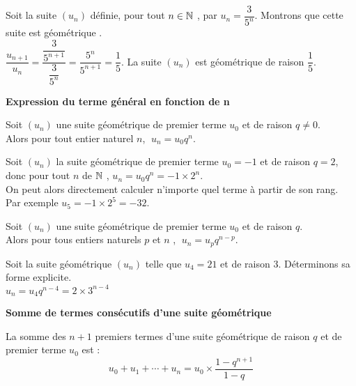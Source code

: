  \begin{example}

 Soit la suite $(u_{n})$ définie, pour tout $ n\in\mathbb{N} $ , par $ u_{n}=\dfrac{3}{5^{n}} $. Montrons que cette suite est géométrique .\\
 $ \dfrac{u_{n+1}}{u_{n}}=\dfrac{\dfrac{3}{5^{n+1}}}{\dfrac{3}{5^{n}}}=\dfrac{5^{n}}{5^{n+1}}=\dfrac{1}{5} $.\;
 La suite $(u_{n})$ est géométrique  de raison $ \dfrac{1}{5} $.
 \end{example}
\textbf{Expression du terme général en fonction de n}
\begin{property}

 Soit $(u_{n})$ une  suite  géométrique de premier terme $u_{0} $ et de raison $ q\neq 0 $. \\Alors pour tout   entier naturel $ n$, $\; u_{n}= u_{0}q^{n}$.
\end{property}


\medskip
\begin{example} 

Soit $(u_{n})$ la  suite géométrique  de premier terme $u_{0}=-1 $ et de raison $ q=2$, donc pour tout $n $ de $\mathbb{N} $ , $ u_{n}=u_{0}q^{n}=-1\times2^{n} $.\\ On peut alors directement calculer n'importe quel terme à partir de son rang. \\Par exemple $ u_{5}=-1\times 2^{5}=-32 $.
\end{example}

\medskip
 
 \begin{property}
 
 \medskip
 \noindent Soit $(u_{n})$ une  suite  géométrique  de premier terme $u_{0} $ et de raison $ q $.\\   Alors pour tous   entiers  naturels $ p $ et  $ n$ ,  $\; u_{n}= u_{p}q^{n-p}$.
 \end{property}

\medskip

\begin{example}

Soit la suite géométrique $( u_n )$ telle que $u_4 = 21$ et de raison 3. Déterminons sa forme explicite.\\
 $ u_n = u_{4} q^{n-4} = 2\times 3^{n-4}$
 \end{example}
  
 
  \textbf{Somme de termes consécutifs d'une suite géométrique}
 \begin{property}
  La  somme  des  $ n+1 $  premiers  termes  d'une  suite  géométrique de raison $ q $  et de  premier terme $ u_0 $ \;  est   :  \[  u_0+u_1+\cdots +u_n =u_{0}\times\dfrac{1-q^{n+1}}{1-q}\]
  \end{property}

